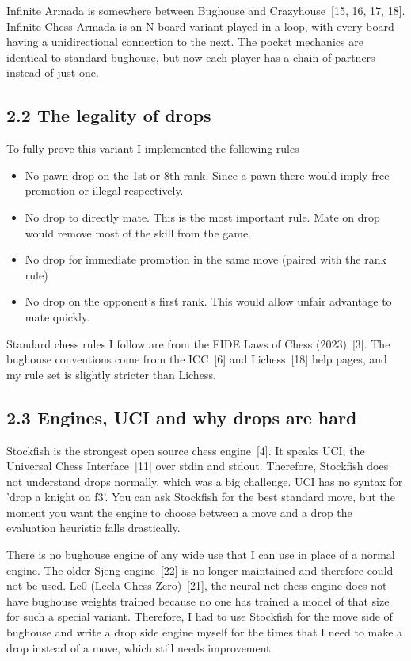 \documentclass[11pt,a4paper]{article}
\begin{document}
Infinite Armada is somewhere between Bughouse and Crazyhouse~[15, 16, 17, 18]. Infinite Chess Armada is an N board variant played in a loop, with every board having a unidirectional connection to the next. The pocket mechanics are identical to standard bughouse, but now each player has a chain of partners instead of just one.

\subsection*{2.2 The legality of drops}
To fully prove this variant I implemented the following rules

\begin{itemize}[leftmargin=*]
\item No pawn drop on the 1st or 8th rank. Since a pawn there would imply free promotion or illegal respectively.
\item No drop to directly mate. This is the most important rule. Mate on drop would remove most of the skill from the game.
\item No drop for immediate promotion in the same move (paired with the rank rule)
\item No drop on the opponent's first rank. This would allow unfair advantage to mate quickly.
\end{itemize}
Standard chess rules I follow are from the FIDE Laws of Chess (2023)~[3]. The bughouse conventions come from the ICC~[6] and Lichess~[18] help pages, and my rule set is slightly stricter than Lichess.

\subsection*{2.3 Engines, UCI and why drops are hard}
Stockfish is the strongest open source chess engine~[4]. It speaks UCI, the Universal Chess Interface~[11] over stdin and stdout. Therefore, Stockfish does not understand drops normally, which was a big challenge. UCI has no syntax for 'drop a knight on f3'. You can ask Stockfish for the best standard move, but the moment you want the engine to choose between a move and a drop the evaluation heuristic falls drastically.

There is no bughouse engine of any wide use that I can use in place of a normal engine. The older Sjeng engine~[22] is no longer maintained and therefore could not be used. Lc0 (Leela Chess Zero)~[21], the neural net chess engine does not have bughouse weights trained because no one has trained a model of that size for such a special variant. Therefore, I had to use Stockfish for the move side of bughouse and write a drop side engine myself for the times that I need to make a drop instead of a move, which still needs improvement.
\end{document}
